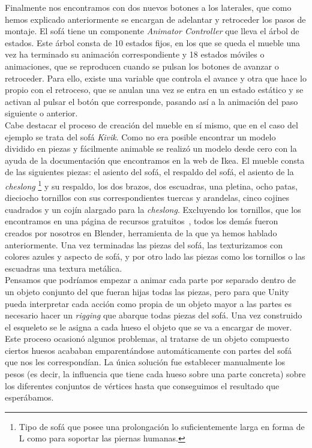 Finalmente nos encontramos con dos nuevos botones a los laterales, que como hemos explicado anteriormente se encargan de adelantar y retroceder los pasos de montaje. El sofá tiene un componente \textit{Animator Controller} que lleva el árbol de estados. Este árbol consta de 10 estados fijos, en los que se queda el mueble una vez ha terminado su animación correspondiente y 18 estados móviles o animaciones, que se reproducen cuando se pulsan los botones de avanzar o retroceder. Para ello, existe una variable que controla el avance y otra que hace lo propio con el retroceso, que se anulan una vez se entra en un estado estático y se activan al pulsar el botón que corresponde, pasando así a la animación del paso siguiente o anterior.\\

Cabe destacar el proceso de creación del mueble en sí mismo, que en el caso del ejemplo se trata del sofá \textit{Kivik}. Como no era posible encontrar un modelo dividido en piezas y fácilmente animable se realizó un modelo desde cero con la ayuda de la documentación que encontramos en la web de Ikea. El mueble consta de las siguientes piezas: el asiento del sofá, el respaldo del sofá, el asiento de la \textit{cheslong} \footnote{ Tipo de sofá que posee una prolongación lo suficientemente larga en forma de L como para soportar las piernas humanas.} y su respaldo, los dos brazos, dos escuadras, una pletina, ocho patas, dieciocho tornillos con sus correspondientes tuercas y arandelas, cinco cojines cuadrados y un cojín alargado para la \textit{cheslong}. Excluyendo los tornillos, que los encontramos en una página de recursos gratuitos~\cite{tornillos}, todos los demás fueron creados por nosotros en Blender, herramienta de la que ya hemos hablado anteriormente. Una vez terminadas las piezas del sofá, las texturizamos con colores azules y aspecto de sofá, y por otro lado las piezas como los tornillos o las escuadras una textura metálica.\\

Pensamos que podríamos empezar a animar cada parte por separado dentro de un objeto conjunto del que fueran hijas todas las piezas, pero para que Unity pueda interpretar cada acción como propia de un objeto mayor a las partes es necesario hacer un \textit{rigging} que abarque todas piezas del sofá. Una vez construido el esqueleto se le asigna a cada hueso el objeto que se va a encargar de mover. Este proceso ocasionó algunos problemas, al tratarse de un objeto compuesto ciertos huesos acababan emparentándose automáticamente con partes del sofá que nos les correspondían. La única solución fue establecer manualmente los pesos (es decir, la influencia que tiene cada hueso sobre una parte concreta) sobre los diferentes conjuntos de vértices hasta que conseguimos el resultado que esperábamos.\\

